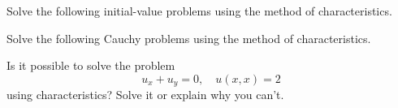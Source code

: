 \documentclass[12pt,fleqn,leqno]{exam}
\begin{document}
\begin{questions}

\question Solve the following initial-value problems using the method of characteristics.


\question Solve the following Cauchy problems using the method of characteristics.


\question Is it possible to solve the problem \[u_x + u_y = 0, \quad u(x, x) = 2\] using characteristics? Solve it or explain why you can't.
\end{questions}
\end{document}
